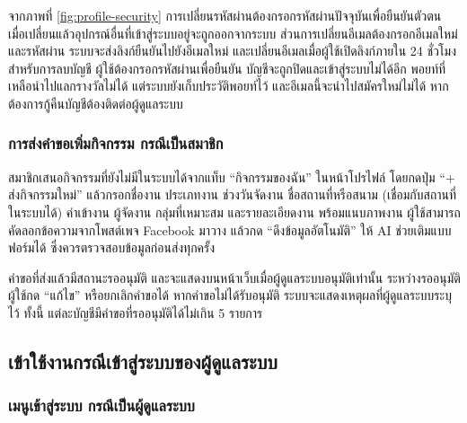 


จากภาพที่ \ref{fig:profile-security} การเปลี่ยนรหัสผ่านต้องกรอกรหัสผ่านปัจจุบันเพื่อยืนยันตัวตน เมื่อเปลี่ยนแล้วอุปกรณ์อื่นที่เข้าสู่ระบบอยู่จะถูกออกจากระบบ ส่วนการเปลี่ยนอีเมลต้องกรอกอีเมลใหม่และรหัสผ่าน ระบบจะส่งลิงก์ยืนยันไปยังอีเมลใหม่ และเปลี่ยนอีเมลเมื่อผู้ใช้เปิดลิงก์ภายใน 24 ชั่วโมง สำหรับการลบบัญชี ผู้ใช้ต้องกรอกรหัสผ่านเพื่อยืนยัน บัญชีจะถูกปิดและเข้าสู่ระบบไม่ได้อีก พอยท์ที่เหลือนำไปแลกรางวัลไม่ได้ แต่ระบบยังเก็บประวัติพอยท์ไว้ และอีเมลนี้จะนำไปสมัครใหม่ไม่ได้ หากต้องการกู้คืนบัญชีต้องติดต่อผู้ดูแลระบบ

\subsubsection{การส่งคำขอเพิ่มกิจกรรม กรณีเป็นสมาชิก}

สมาชิกเสนอกิจกรรมที่ยังไม่มีในระบบได้จากแท็บ ``กิจกรรมของฉัน'' ในหน้าโปรไฟล์ โดยกดปุ่ม ``+ ส่งกิจกรรมใหม่'' แล้วกรอกชื่องาน ประเภทงาน ช่วงวันจัดงาน ชื่อสถานที่หรือสนาม (เชื่อมกับสถานที่ในระบบได้) ค่าเข้างาน ผู้จัดงาน กลุ่มที่เหมาะสม และรายละเอียดงาน พร้อมแนบภาพงาน ผู้ใช้สามารถคัดลอกข้อความจากโพสต์เพจ Facebook มาวาง แล้วกด ``ดึงข้อมูลอัตโนมัติ'' ให้ AI ช่วยเติมแบบฟอร์มได้ ซึ่งควรตรวจสอบข้อมูลก่อนส่งทุกครั้ง


คำขอที่ส่งแล้วมีสถานะรออนุมัติ และจะแสดงบนหน้าเว็บเมื่อผู้ดูแลระบบอนุมัติเท่านั้น ระหว่างรออนุมัติ ผู้ใช้กด ``แก้ไข'' หรือยกเลิกคำขอได้ หากคำขอไม่ได้รับอนุมัติ ระบบจะแสดงเหตุผลที่ผู้ดูแลระบบระบุไว้ ทั้งนี้ แต่ละบัญชีมีคำขอที่รออนุมัติได้ไม่เกิน 5 รายการ

\subsection{เข้าใช้งานกรณีเข้าสู่ระบบของผู้ดูแลระบบ}
\label{sec:admin-guide}

\subsubsection{เมนูเข้าสู่ระบบ กรณีเป็นผู้ดูแลระบบ}

